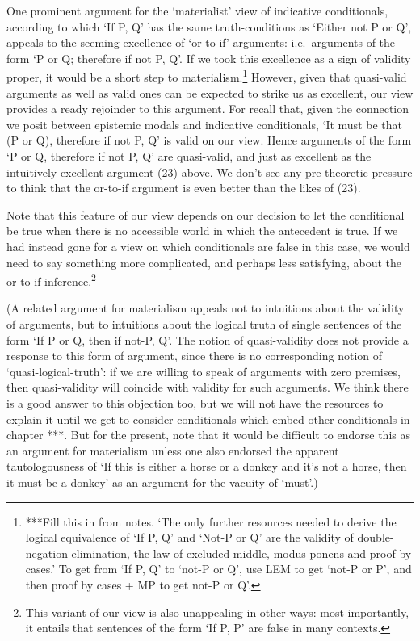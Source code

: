 One prominent argument for the `materialist' view of indicative
conditionals, according to which `If P, Q' has the same truth-conditions
as `Either not P or Q', appeals to the seeming excellence of `or-to-if'
arguments: i.e.~arguments of the form `P or Q; therefore if not P, Q'.
If we took this excellence as a sign of validity proper, it would be a
short step to materialism.\footnote{***Fill this in from notes. `The
  only further resources needed to derive the logical equivalence of `If
  P, Q' and `Not-P or Q' are the validity of double-negation
  elimination, the law of excluded middle, modus ponens and proof by
  cases.' To get from `If P, Q' to `not-P or Q', use LEM to get `not-P
  or P', and then proof by cases + MP to get not-P or Q'.} However,
given that quasi-valid arguments as well as valid ones can be expected
to strike us as excellent, our view provides a ready rejoinder to this
argument. For recall that, given the connection we posit between
epistemic modals and indicative conditionals, `It must be that (P or Q),
therefore if not P, Q' is valid on our view. Hence arguments of the form
`P or Q, therefore if not P, Q' are quasi-valid, and just as excellent
as the intuitively excellent argument (23) above. We don't see any
pre-theoretic pressure to think that the or-to-if argument is even
better than the likes of (23).

Note that this feature of our view depends on our decision to let the
conditional be true when there is no accessible world in which the
antecedent is true. If we had instead gone for a view on which
conditionals are false in this case, we would need to say something more
complicated, and perhaps less satisfying, about the or-to-if
inference.\footnote{This variant of our view is also unappealing in
  other ways: most importantly, it entails that sentences of the form
  `If P, P' are false in many contexts.}

(A related argument for materialism appeals not to intuitions about the
validity of arguments, but to intuitions about the logical truth of
single sentences of the form `If P or Q, then if not-P, Q'. The notion
of quasi-validity does not provide a response to this form of argument,
since there is no corresponding notion of `quasi-logical-truth': if we
are willing to speak of arguments with zero premises, then
quasi-validity will coincide with validity for such arguments. We think
there is a good answer to this objection too, but we will not have the
resources to explain it until we get to consider conditionals which
embed other conditionals in chapter ***. But for the present, note that
it would be difficult to endorse this as an argument for materialism
unless one also endorsed the apparent tautologousness of `If this is
either a horse or a donkey and it's not a horse, then it must be a
donkey' as an argument for the vacuity of `must'.)

